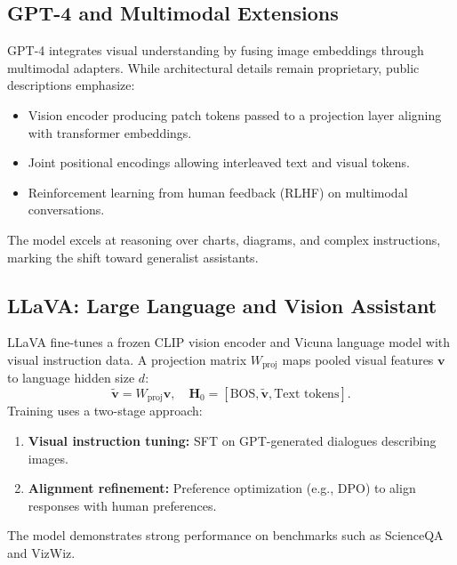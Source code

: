 \documentclass{article}
\begin{document}
\subsection{GPT-4 and Multimodal Extensions}
GPT-4 integrates visual understanding by fusing image embeddings through multimodal adapters. While architectural details remain proprietary, public descriptions emphasize:
\begin{itemize}
  \item Vision encoder producing patch tokens passed to a projection layer aligning with transformer embeddings.
  \item Joint positional encodings allowing interleaved text and visual tokens.
  \item Reinforcement learning from human feedback (RLHF) on multimodal conversations.
\end{itemize}
The model excels at reasoning over charts, diagrams, and complex instructions, marking the shift toward generalist assistants.

\subsection{LLaVA: Large Language and Vision Assistant}
LLaVA fine-tunes a frozen CLIP vision encoder and Vicuna language model with visual instruction data. A projection matrix $W_{\text{proj}}$ maps pooled visual features $\mathbf{v}$ to language hidden size $d$:
\begin{equation}
  \tilde{\mathbf{v}} = W_{\text{proj}} \mathbf{v}, \quad \mathbf{H}_0 = [\text{BOS}, \tilde{\mathbf{v}}, \text{Text tokens}].
\end{equation}
Training uses a two-stage approach:
\begin{enumerate}
  \item \textbf{Visual instruction tuning:} SFT on GPT-generated dialogues describing images.
  \item \textbf{Alignment refinement:} Preference optimization (e.g., DPO) to align responses with human preferences.
\end{enumerate}
The model demonstrates strong performance on benchmarks such as ScienceQA and VizWiz.
\end{document}

